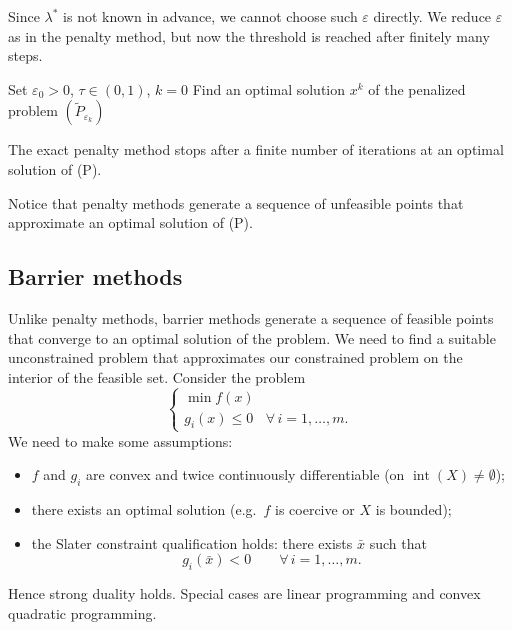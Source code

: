 Since $\lambda^*$ is not known in advance, we cannot choose such $\varepsilon$ directly. We reduce $\varepsilon$ as in the penalty method, but now the threshold is reached after finitely many steps.

\begin{algorithm}[htbp]
\caption{Exact penalty method}
Set $\varepsilon_0 > 0$, $\tau \in (0,1)$, $k = 0$\;
Find an optimal solution $x^k$ of the penalized problem $(\tilde P_{\varepsilon_k})$\;
\end{algorithm}

\begin{theorem}
The exact penalty method stops after a finite number of iterations at an optimal solution of (P).
\end{theorem}

Notice that penalty methods generate a sequence of unfeasible points that approximate an optimal solution of (P).

\subsection{Barrier methods}

Unlike penalty methods, barrier methods generate a sequence of feasible points that converge to an optimal solution of the problem. We need to find a suitable unconstrained problem that approximates our constrained problem on the interior of the feasible set. Consider the problem
\[
\begin{cases}
\min f(x)\\
g_i(x) \le 0 & \forall\, i=1,\dots,m.
\end{cases}
\tag{P}
\]
We need to make some assumptions:
\begin{itemize}
    \item $f$ and $g_i$ are convex and twice continuously differentiable (on $\operatorname{int}(X) \ne \emptyset$);
    \item there exists an optimal solution (e.g.\ $f$ is coercive or $X$ is bounded);
    \item the Slater constraint qualification holds: there exists $\bar x$ such that
    \[
    g_i(\bar x) < 0 \qquad \forall\, i=1,\dots,m.
    \]
\end{itemize}
Hence strong duality holds. Special cases are linear programming and convex quadratic programming.


